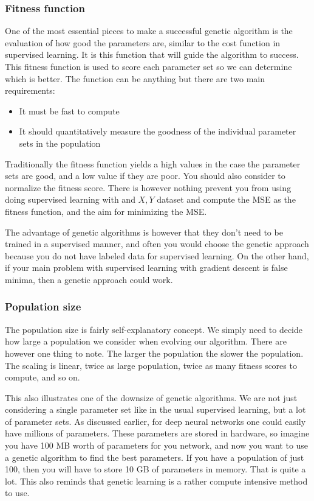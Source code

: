 \documentclass[12pt,a4paper]{article} %
\numberwithin{equation}{section}
\begin{document}
		\subsubsection{Fitness function}
			One of the most essential pieces to make a successful genetic algorithm is the evaluation of how good the parameters are, similar to the cost function in supervised learning. It is this function that will guide the algorithm to success. This fitness function is used to score each parameter set so we can determine which is better. The function can be anything but there are two main requirements:
			\begin{itemize}
				\item It must be fast to compute
				\item It should quantitatively measure the goodness of the individual parameter sets in the population
			\end{itemize}
			Traditionally the fitness function yields a high values in the case the parameter sets are good, and a low value if they are poor. You should also consider to normalize the fitness score. There is however nothing prevent you from using doing supervised learning with and $X, Y$ dataset and compute the MSE as the fitness function, and the aim for minimizing the MSE.
			
			The advantage of genetic algorithms is however that they don't need to be trained in a supervised manner, and often you would choose the genetic approach because you do not have labeled data for supervised learning. On the other hand, if your main problem with supervised learning with gradient descent is false minima, then a genetic approach could work.
			
		\subsubsection{Population size}
			The population size is fairly self-explanatory concept. We simply need to decide how large a population we consider when evolving our algorithm. There are however one thing to note. The larger the population the slower the population. The scaling is linear, twice as large population, twice as many fitness scores to compute, and so on.
			
			This also illustrates one of the downsize of genetic algorithms. We are not just considering a single parameter set like in the usual supervised learning, but a lot of parameter sets. As discussed earlier, for deep neural networks one could easily have millions of parameters. These parameters are stored in hardware, so imagine you have 100 MB worth of parameters for you network, and now you want to use a genetic algorithm to find the best parameters. If you have a population of just 100, then you will have to store 10 GB of parameters in memory. That is quite a lot. This also reminds that genetic learning is a rather compute intensive method to use.
			
\end{document}
